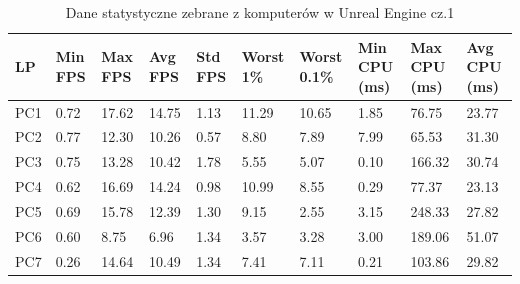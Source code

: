 \documentclass[12pt,twoside]{article}
\begin{document}
\begin{table}[H]
    \caption{Dane statystyczne zebrane z komputerów w Unreal Engine cz.1}
    \centering		
        \begin{tabular}{|p{1cm}|p{1cm}|p{1cm}|p{1cm}|p{1cm}|p{1cm}|p{1cm}|p{1cm}|p{}|p{1cm}|}	
            \hline
            LP & Min FPS & Max FPS & Avg FPS & Std FPS & Worst 1\% & Worst 0.1\% & Min CPU (ms) & Max CPU (ms)  & Avg CPU (ms) \\
            \hline
            PC1 &0.72 & 17.62 & 14.75 & 1.13 & 11.29 & 10.65 & 1.85 & 76.75 & 23.77  \\	
            \hline
            PC2 & 0.77 & 12.30 & 10.26 & 0.57 & 8.80 & 7.89 & 7.99 & 65.53 & 31.30 \\
            \hline
            PC3 & 0.75 & 13.28 & 10.42 & 1.78 & 5.55 & 5.07 & 0.10 & 166.32 & 30.74  \\
            \hline
            PC4 & 0.62 & 16.69 & 14.24 & 0.98 & 10.99 & 8.55 & 0.29 & 77.37 & 23.13  \\
            \hline
            PC5 & 0.69 & 15.78 & 12.39 & 1.30 & 9.15 & 2.55 & 3.15 & 248.33 & 27.82  \\
            \hline
            PC6 & 0.60 & 8.75 & 6.96 & 1.34 & 3.57 & 3.28 & 3.00 & 189.06 & 51.07  \\
            \hline
            PC7 & 0.26 & 14.64 & 10.49 & 1.34 & 7.41 & 7.11 & 0.21 & 103.86 & 29.82 \\
            \hline

        \end{tabular}	
    \label{Tabela:StatystykiUnreal1}
    \end{table}	
\end{document}
